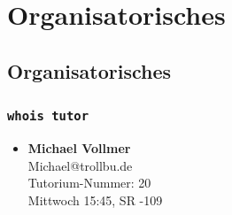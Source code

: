 

\section{Organisatorisches}

\subsection{Organisatorisches}

\begin{frame}
	\frametitle{\texttt{whois tutor}}
	
	\begin{itemize}
		\item \textbf{Michael Vollmer} \\ Michael@trollbu.de \\ Tutorium-Nummer: 20 \\ Mittwoch 15:45, SR -109
	\end{itemize}
\end{frame}

